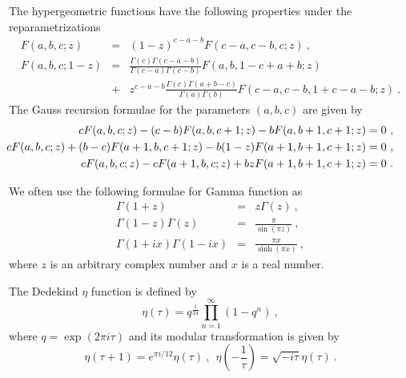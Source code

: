 \documentclass[a4paper,12pt]{article}
\newcommand{\nn}{\nonumber\\}
\begin{document}
The hypergeometric functions have the following properties under the
reparametrizations 
\begin{eqnarray}
 F(a,b,c;z)&=& (1-z)^{c-a-b} F (c-a,c-b,c;z) ~,\\
 F(a,b,c;1-z)&=& \frac{\Gamma (c) \Gamma (c-a-b)}{\Gamma (c-a) \Gamma (c-b)}
  F (a,b,1-c+a+b;z) \nn
   &+& z^{c-a-b}   \frac{\Gamma (c) \Gamma (a+b-c)}{\Gamma (a) \Gamma (b)}
        F (c-a, c-b, 1+c-a-b;z) ~.
\end{eqnarray}
The Gauss recursion formulae for the parameters $(a,b,c)$ are given by
\begin{eqnarray}
&& c F (a,b,c;z) - (c-b) F (a,b,c+1;z) - b F (a,b+1,c+1;z) = 0 ~,\\
&&\hspace{-1cm} 
 c F (a,b,c;z) + (b-c) F (a+1,b,c+1;z) - b (1-z) F(a+1,b+1,c+1;z) = 0 ~,\\
&& c F (a,b,c;z) - c F (a+1,b,c;z) + b z F (a+1,b+1,c+1;z) = 0 ~. 
\end{eqnarray} 

We often use the following formulae for Gamma function as
\begin{eqnarray}
 \Gamma (1+z) &=& z \Gamma (z) ~,\\
 \Gamma (1-z) \Gamma (z) &=& \frac{\pi}{\sin(\pi z)}  ~,\\
 \Gamma (1 + ix) \Gamma (1 - ix)  &=& \frac{\pi x}{\sinh (\pi x)}~,
\end{eqnarray}
where $z$ is an arbitrary complex number and $x$ is a real number.

The Dedekind $\eta$ function is defined by
\begin{equation}
 \eta (\tau) = q^{\frac{1}{24}} \prod_{n=1}^{\infty} (1 - q^n) ~,
\end{equation}
where $q=\exp (2 \pi i \tau)$ and its modular transformation is given by
\begin{equation}
 \eta (\tau + 1) =
  e^{\pi i / 12} \eta (\tau) ~,~~
 \eta (- \frac{1}{\tau}) =
  \sqrt{-i \tau} \eta (\tau) ~.
\label{etam}
\end{equation} 

\end{document}
